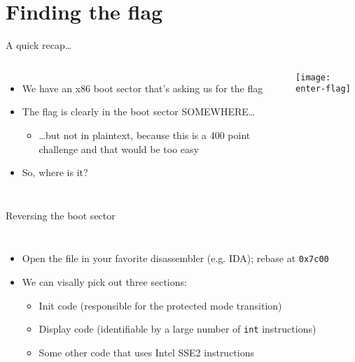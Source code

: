 
\section{Finding the flag}

\begin{frame}{A quick recap\ldots}
    \begin{columns}
        \begin{itemize}
            \item<1-> We have an x86 boot sector that's asking us for the flag
            \item<2-> The flag is clearly in the boot sector SOMEWHERE\ldots
            \begin{itemize}
                \item<3-> \ldots but not in plaintext, because this is a 400
                          point challenge and that would be too easy
            \end{itemize}
            \item<4-> So, where is it?
        \end{itemize}
        \texttt{[image: enter-flag]}
    \end{columns}
\end{frame}

\begin{frame}{Reversing the boot sector}
    \begin{columns}
        \begin{itemize}
            \item<1-> Open the file in your favorite disassembler (e.g. IDA);
                      rebase at \texttt{0x7c00}
            \item<2-> We can visally pick out three sections:
            \begin{itemize}
                \item<2-> Init code (responsible for the protected
                          mode transition)
                \item<2-> Display code (identifiable by a large number of
                          \texttt{int} instructions)
                \item<2-> Some other code that uses Intel SSE2 instructions
            \end{itemize}
        \end{itemize}
    \end{columns}
\end{frame}

